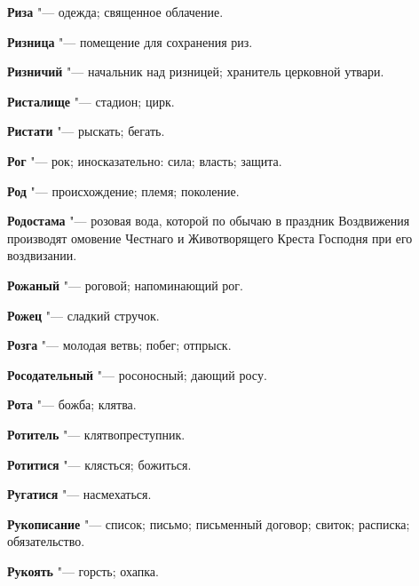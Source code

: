 \begin{mymulticols}{2}
\noindent\textbf{Риза} "--- одежда; священное облачение. 




\noindent\textbf{Ризница} "--- помещение для сохранения риз. 




\noindent\textbf{Ризничий} "--- начальник над ризницей; хранитель церковной утвари. 




\noindent\textbf{Ристалище} "--- стадион; цирк. 




\noindent\textbf{Ристати} "--- рыскать; бегать. 




\noindent\textbf{Рог} "--- рок; иносказательно: сила; власть; защита. 




\noindent\textbf{Род} "--- происхождение; племя; поколение. 




\noindent\textbf{Родостама} "--- розовая вода, которой по обычаю в праздник Воздвижения производят омовение Честнаго и Животворящего Креста Господня при его воздвизании. 




\noindent\textbf{Рожаный} "--- роговой; напоминающий рог. 




\noindent\textbf{Рожец} "--- сладкий стручок. 




\noindent\textbf{Розга} "--- молодая ветвь; побег; отпрыск. 




\noindent\textbf{Росодательный} "--- росоносный; дающий росу. 




\noindent\textbf{Рота} "--- божба; клятва. 




\noindent\textbf{Ротитель} "--- клятвопреступник. 




\noindent\textbf{Ротитися} "--- клясться; божиться. 




\noindent\textbf{Ругатися} "--- насмехаться. 




\noindent\textbf{Рукописание} "--- список; письмо; письменный договор; свиток; расписка; обязательство. 




\noindent\textbf{Рукоять} "--- горсть; охапка. 





\end{mymulticols}
